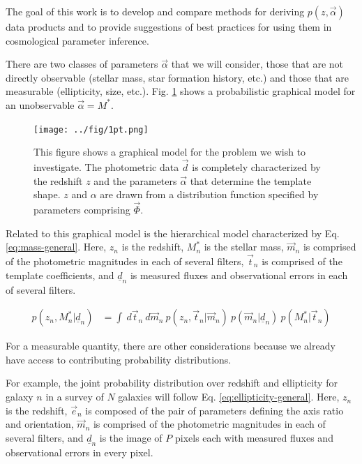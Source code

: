 \documentclass[12pt, preprint]{aastex}
\newcommand{\textul}{\underline}
\begin{document}
The goal of this work is to develop and compare methods for deriving $p(z,\vec{\alpha})$ data products and to provide suggestions of best practices for using them in cosmological parameter inference.

There are two classes of parameters $\vec{\alpha}$ that we will consider, those that are not directly observable (stellar mass, star formation history, etc.) and those that are measurable (ellipticity, size, etc.).  Fig. \ref{fig:1pt} shows a probabilistic graphical model for an unobservable $\vec{\alpha}=M^{*}$.

\begin{figure}
\texttt{[image: ../fig/1pt.png]}
\caption{This figure shows a graphical model for the problem we wish to investigate.  The photometric data $\vec{d}$ is completely characterized by the redshift $z$ and the parameters $\vec{\alpha}$ that determine the template shape.  $z$ and $\alpha$ are drawn from a distribution function specified by parameters comprising $\vec{\Phi}$.}
\label{fig:1pt}
\end{figure}

Related to this graphical model is the hierarchical model characterized by Eq. \ref{eq:mass-general}.  Here, $z_{n}$ is the redshift, $M^{*}_{n}$ is the stellar mass, $\vec{m}_{n}$ is comprised of the photometric magnitudes in each of several filters, $\vec{t}_{n}$ is comprised of the template coefficients, and $\textul{d}_{n}$ is measured fluxes and observational errors in each of several filters.

\begin{align}
\label{eq:mass-general}
p(z_{n}, M^{*}_{n}|\textul{d}_{n}) &= \int\ d\vec{t}_{n}\ d\vec{m}_{n}\ p(z_{n}, \vec{t}_{n}|\vec{m}_{n})\ p(\vec{m}_{n}|\textul{d}_{n})\ p(M^{*}_{n}|\vec{t}_{n})
\end{align}

For a measurable quantity, there are other considerations because we already have access to contributing probability distributions.  

For example, the joint probability distribution over redshift and ellipticity for galaxy $n$ in a survey of $N$ galaxies will follow Eq. \ref{eq:ellipticity-general}.  Here, $z_{n}$ is the redshift, $\vec{e}_{n}$ is composed of the pair of parameters defining the axis ratio and orientation, $\vec{m}_{n}$ is comprised of the photometric magnitudes in each of several filters, and $\textul{d}_{n}$ is the image of $P$ pixels each with measured fluxes and observational errors in every pixel.  
\end{document}
